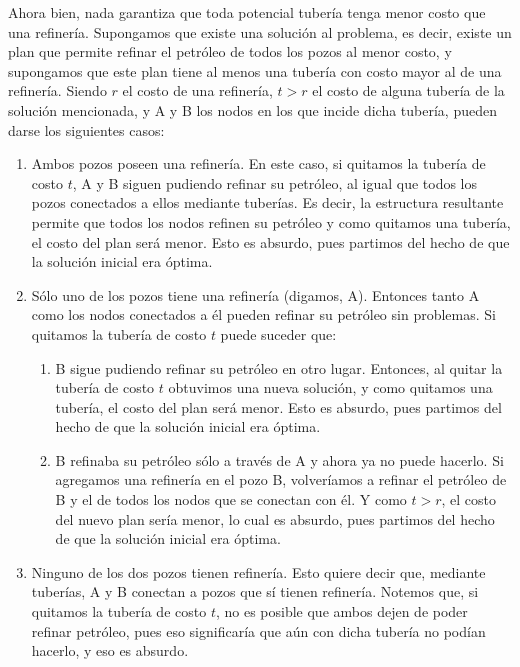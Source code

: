 Ahora bien, nada garantiza que toda potencial tubería tenga menor costo que una refinería. Supongamos que existe una solución al problema, es decir, existe un plan que permite refinar el petróleo de todos los pozos al menor costo, y supongamos que este plan tiene al menos una tubería con costo mayor al de una refinería. Siendo $r$ el costo de una refinería, $t > r$ el costo de alguna tubería de la solución mencionada, y A y B los nodos en los que incide dicha tubería, pueden darse los siguientes casos:

\begin{enumerate}
	\item Ambos pozos poseen una refinería. En este caso, si quitamos la tubería de costo $t$, A y B siguen pudiendo refinar su petróleo, al igual que todos los pozos conectados a ellos mediante tuberías. Es decir, la estructura resultante permite que todos los nodos refinen su petróleo y como quitamos una tubería, el costo del plan será menor.  Esto es absurdo, pues partimos del hecho de que la solución inicial era óptima.
	\item Sólo uno de los pozos tiene una refinería (digamos, A). Entonces tanto A como los nodos conectados a él pueden refinar su petróleo sin problemas. Si quitamos la tubería de costo $t$ puede suceder que:
	
	\begin{enumerate}
		\item B sigue pudiendo refinar su petróleo en otro lugar.  Entonces, al quitar la tubería de costo $t$ obtuvimos una nueva solución, y como quitamos una tubería, el costo del plan será menor.  Esto es absurdo, pues partimos del hecho de que la solución inicial era óptima.
		\item B refinaba su petróleo sólo a través de A y ahora ya no puede hacerlo. Si agregamos una refinería en el pozo B, volveríamos a refinar el petróleo de B y el de todos los nodos que se conectan con él. Y como $t > r$, el costo del nuevo plan sería menor, lo cual es absurdo, pues partimos del hecho de que la solución inicial era óptima.
	\end{enumerate}
	
	\item Ninguno de los dos pozos tienen refinería. Esto quiere decir que, mediante tuberías, A y B conectan a pozos que sí tienen refinería. Notemos que, si quitamos la tubería de costo $t$, no es posible que ambos dejen de poder refinar petróleo, pues eso significaría que aún con dicha tubería no podían hacerlo, y eso es absurdo.
	

\end{enumerate}
